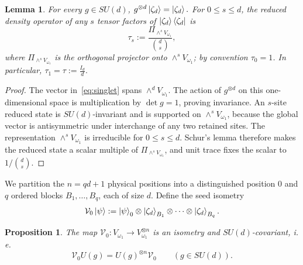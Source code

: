 \documentclass[11pt,letterpaper]{article}
\theoremstyle{plain}
\theoremstyle{plain}
\theoremstyle{plain}
\theoremstyle{plain}
\theoremstyle{plain}
\theoremstyle{plain}
\theoremstyle{plain}
\newtheorem{smproposition}[smtheorem]{Proposition}
\newtheorem{smlemma}[smtheorem]{Lemma}
\theoremstyle{definition}
\theoremstyle{plain}
\begin{document}
\begin{smlemma}
\label{lem:singlet-red-states}
For every $g\in SU(d)$,
$
  g^{\otimes d}\ket{\zeta_d}=\ket{\zeta_d}.
$
For $0\le s\le d$, the reduced density operator of any $s$ tensor factors of $\ket{\zeta_d}\bra{\zeta_d}$ is
\begin{equation}
\label{eq:tau-s}
  \tau_s
  :=\frac{\Pi_{\wedge^sV_{\omega_1}}}{\binom ds},
\end{equation}
where $\Pi_{\wedge^sV_{\omega_1}}$ is the orthogonal projector onto $\wedge^sV_{\omega_1}$; by convention $\tau_0=1$. In particular,
$
  \tau_1=\tau:=\frac{I_d}{d}.
$
\end{smlemma}
\begin{proof}
The vector in~\eqref{eq:singlet} spans $\wedge^dV_{\omega_1}$.  
The action of $g^{\otimes d}$ on this one-dimensional space is multiplication by $\det g=1$, proving invariance. 
An $s$-site reduced state is $SU(d)$-invariant and is supported on $\wedge^sV_{\omega_1}$, because the global vector is antisymmetric under interchange of any two retained sites.  
The representation $\wedge^sV_{\omega_1}$ is irreducible for $0\le s\le d$.  
Schur's lemma therefore makes the reduced state a scalar multiple of $\Pi_{\wedge^sV_{\omega_1}}$, and unit trace fixes the scalar to $1/\binom ds$.
\end{proof}

We partition the $n=qd+1$ physical positions into a distinguished position $0$ and $q$ ordered blocks $B_1,\ldots,B_q$, each of size $d$.  
Define the seed isometry
\begin{equation}
\label{eq:seed-isometry}
  \mathcal{V}_0\ket\psi
  :=\ket\psi_0\otimes\ket{\zeta_d}_{B_1}\otimes\cdots\otimes\ket{\zeta_d}_{B_q}.
\end{equation}

\begin{smproposition}
\label{prop:seed-covariance}
The map $\mathcal{V}_0:V_{\omega_1}\to V_{\omega_1}^{\otimes n}$ is an isometry and $SU(d)$-covariant, i. e.
\[
  \mathcal{V}_0U(g)=U(g)^{\otimes n}\mathcal{V}_0
  \qquad(g\in SU(d)).
\]
\end{smproposition}
\end{document}
